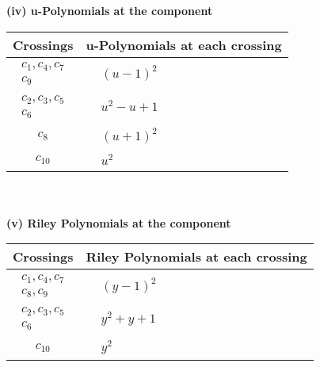 \documentclass[1p]{elsarticle_modified}
\theoremstyle{definition}
\begin{document}
\newpage\renewcommand{\arraystretch}{1}
\flushleft \textbf{(iv) u-Polynomials at the component}\newline \\
\begin{tabular}{m{50pt}|m{274pt}}
Crossings & \hspace{64pt}u-Polynomials at each crossing \\
\hline $$\begin{aligned}c_{1},c_{4},c_{7}\\c_{9}\end{aligned}$$&$\begin{aligned}
&(u-1)^2
\end{aligned}$\\
\hline $$\begin{aligned}c_{2},c_{3},c_{5}\\c_{6}\end{aligned}$$&$\begin{aligned}
&u^2- u+1
\end{aligned}$\\
\hline $$\begin{aligned}c_{8}\end{aligned}$$&$\begin{aligned}
&(u+1)^2
\end{aligned}$\\
\hline $$\begin{aligned}c_{10}\end{aligned}$$&$\begin{aligned}
&u^2
\end{aligned}$\\
\hline
\end{tabular}\\~\\
\newpage\renewcommand{\arraystretch}{1}
\flushleft \textbf{(v) Riley Polynomials at the component}\newline \\
\begin{tabular}{m{50pt}|m{274pt}}
Crossings & \hspace{64pt}Riley Polynomials at each crossing \\
\hline $$\begin{aligned}c_{1},c_{4},c_{7}\\c_{8},c_{9}\end{aligned}$$&$\begin{aligned}
&(y-1)^2
\end{aligned}$\\
\hline $$\begin{aligned}c_{2},c_{3},c_{5}\\c_{6}\end{aligned}$$&$\begin{aligned}
&y^2+y+1
\end{aligned}$\\
\hline $$\begin{aligned}c_{10}\end{aligned}$$&$\begin{aligned}
&y^2
\end{aligned}$\\
\hline
\end{tabular}\\~\\
\end{document}
